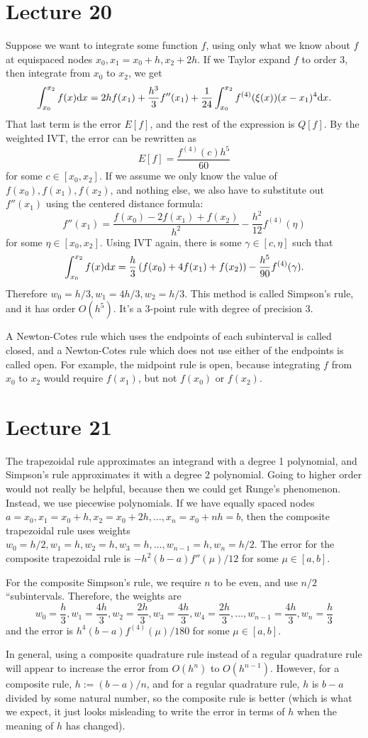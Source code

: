 \documentclass{article}
\begin{document}
\section{Lecture 20}
Suppose we want to integrate some function $f$, using only what we know about $f$ at equispaced nodes $x_0, x_1 = x_0+h, x_2+2h$. If we Taylor expand $f$ to order 3, then integrate from $x_0$ to $x_2$, we get
\[ \int_{x_0}^{x_2} f(x) \mathrm{d} x = 2hf(x_1) + \frac{h^3}{3} f''(x_1) + \frac{1}{24} \int_{x_0}^{x_2} f^{(4)}(\xi(x))(x-x_1)^4 \mathrm{d} x. \]
That last term is the error $E[f]$, and the rest of the expression is $Q[f]$. By the weighted IVT, the error can be rewritten as
\[ E[f] = \frac{f^{(4)}(c)h^5}{60} \]
for some $c \in [x_0, x_2]$. If we assume we only know the value of $f(x_0), f(x_1), f(x_2)$, and nothing else, we also have to substitute out $f''(x_1)$ using the centered distance formula:
\[ f''(x_1) = \frac{f(x_0)-2f(x_1)+f(x_2)}{h^2} - \frac{h^2}{12} f^{(4)}(\eta) \]
for some $\eta \in [x_0, x_2]$. Using IVT again, there is some $\gamma \in [c, \eta]$ such that
\[ \int_{x_0}^{x_2} f(x)\mathrm{d} x = \frac{h}{3} \left( f(x_0) +4f(x_1) +f(x_2) \right) - \frac{h^5}{90} f^{(4)}(\gamma). \]
Therefore $w_0=h/3, w_1=4h/3, w_2=h/3$. This method is called Simpson's rule, and it has order $O(h^5)$. It's a 3-point rule with degree of precision 3.
\par
A Newton-Cotes rule which uses the endpoints of each subinterval is called closed, and a Newton-Cotes rule which does not use either of the endpoints is called open. For example, the midpoint rule is open, because integrating $f$ from $x_0$ to $x_2$ would require $f(x_1)$, but not $f(x_0)$ or $f(x_2)$.

\section{Lecture 21}
The trapezoidal rule approximates an integrand with a degree 1 polynomial, and Simpson's rule approximates it with a degree 2 polynomial. Going to higher order would not really be helpful, because then we could get Runge's phenomenon. Instead, we use piecewise polynomials. If we have equally spaced nodes $a=x_0, x_1 = x_0+h,x_2=x_0+2h, \dots, x_n=x_0+nh=b$, then the composite trapezoidal rule uses weights $w_0= h/2, w_1=h, w_2=h, w_3 = h, \dots, w_{n-1}=h, w_n=h/2$. The error for the composite trapezoidal rule is $-h^2(b-a)f''(\mu)/12$ for some $\mu \in [a,b]$.
\par
For the composite Simpson's rule, we require $n$ to be even, and use $n/2$ ``subintervals. Therefore, the weights are
\[ w_0 = \frac{h}{3}, w_1 = \frac{4h}{3}, w_2 = \frac{2h}{3}, w_3= \frac{4h}{3}, w_4= \frac{2h}{3}, \dots, w_{n-1}= \frac{4h}{3}, w_n = \frac{h}{3} \]
and the error is $h^4 (b-a) f^{(4)}(\mu) / 180$ for some $\mu \in [a,b]$.
\par
In general, using a composite quadrature rule instead of a regular quadrature rule will appear to increase the error from $O(h^n)$ to $O(h^{n-1})$. However, for a composite rule, $h := (b-a)/n$, and for a regular quadrature rule, $h$ is $b-a$ divided by some natural number, so the composite rule is better (which is what we expect, it just looks misleading to write the error in terms of $h$ when the meaning of $h$ has changed).
\end{document}
